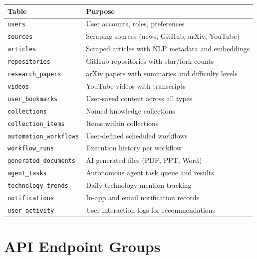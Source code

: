 \documentclass[12pt,a4paper]{report}
\begin{document}
\begin{center}
\begin{tabular}{lp{9cm}}
\toprule
\textbf{Table} & \textbf{Purpose} \\
\midrule
\texttt{users}               & User accounts, roles, preferences \\
\texttt{sources}             & Scraping sources (news, GitHub, arXiv, YouTube) \\
\texttt{articles}            & Scraped articles with NLP metadata and embeddings \\
\texttt{repositories}        & GitHub repositories with star/fork counts \\
\texttt{research\_papers}    & arXiv papers with summaries and difficulty levels \\
\texttt{videos}              & YouTube videos with transcripts \\
\texttt{user\_bookmarks}     & User-saved content across all types \\
\texttt{collections}         & Named knowledge collections \\
\texttt{collection\_items}   & Items within collections \\
\texttt{automation\_workflows} & User-defined scheduled workflows \\
\texttt{workflow\_runs}      & Execution history per workflow \\
\texttt{generated\_documents} & AI-generated files (PDF, PPT, Word) \\
\texttt{agent\_tasks}        & Autonomous agent task queue and results \\
\texttt{technology\_trends}  & Daily technology mention tracking \\
\texttt{notifications}       & In-app and email notification records \\
\texttt{user\_activity}      & User interaction logs for recommendations \\
\bottomrule
\end{tabular}
\end{center}

\section{API Endpoint Groups}
\end{document}
